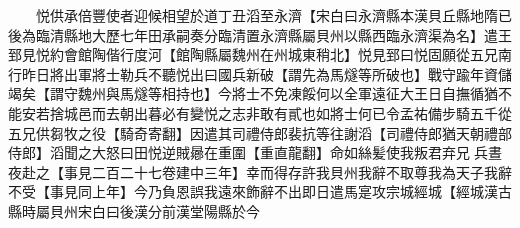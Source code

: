 　　悦供承倍豐使者迎候相望於道丁丑滔至永濟【宋白曰永濟縣本漢貝丘縣地隋已後為臨清縣地大歷七年田承嗣奏分臨清置永濟縣屬貝州以縣西臨永濟渠為名】遣王郅見悦約會館陶偕行度河【館陶縣屬魏州在州城東稍北】悦見郅曰悦固願從五兄南行昨日將出軍將士勒兵不聽悦出曰國兵新破【謂先為馬燧等所破也】戰守踰年資儲竭矣【謂守魏州與馬燧等相持也】今將士不免凍餒何以全軍遠征大王日自撫循猶不能安若捨城邑而去朝出暮必有變悦之志非敢有貳也如將士何已令孟祐備步騎五千從五兄供芻牧之役【騎奇寄翻】因遣其司禮侍郎裴抗等往謝滔【司禮侍郎猶天朝禮部侍郎】滔聞之大怒曰田悦逆賊曏在重圍【重直龍翻】命如絲髪使我叛君弃兄兵晝夜赴之【事見二百二十七卷建中三年】幸而得存許我貝州我辭不取尊我為天子我辭不受【事見同上年】今乃負恩誤我遠來飾辭不出即日遣馬寔攻宗城經城【經城漢古縣時屬貝州宋白曰後漢分前漢堂陽縣於今